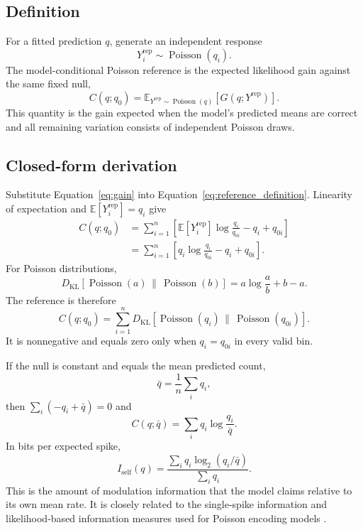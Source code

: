 \documentclass[11pt]{article}
\newcommand{\E}{\mathbb{E}}
\newcommand{\Pois}{\operatorname{Poisson}}
\newcommand{\KL}{D_{\mathrm{KL}}}
\begin{document}
\subsection{Definition}

For a fitted prediction $q$, generate an independent response
\begin{equation}
Y_i^{\mathrm{rep}}\sim\Pois(q_i).
\end{equation}
The model-conditional Poisson reference is the expected likelihood gain against the same fixed null,
\begin{equation}
C(q;q_0)
=
\E_{Y^{\mathrm{rep}}\sim\Pois(q)}
\left[G(q;Y^{\mathrm{rep}})\right].
\label{eq:reference_definition}
\end{equation}
This quantity is the gain expected when the model's predicted means are correct and all remaining variation consists of independent Poisson draws.

\subsection{Closed-form derivation}

Substitute Equation~\ref{eq:gain} into Equation~\ref{eq:reference_definition}. Linearity of expectation and $\E[Y_i^{\mathrm{rep}}]=q_i$ give
\begin{align}
C(q;q_0)
&=
\sum_{i=1}^n
\left[
 \E[Y_i^{\mathrm{rep}}]\log\frac{q_i}{q_{0i}}
 -q_i+q_{0i}
\right]\\
&=
\boxed{
\sum_{i=1}^n
\left[
 q_i\log\frac{q_i}{q_{0i}}-q_i+q_{0i}
\right]
}.
\label{eq:closed_reference}
\end{align}
For Poisson distributions,
\begin{equation}
\KL\!\left[\Pois(a)\,\|\,\Pois(b)\right]
=
a\log\frac{a}{b}+b-a.
\end{equation}
The reference is therefore
\begin{equation}
\boxed{
C(q;q_0)
=
\sum_{i=1}^n
\KL\!\left[\Pois(q_i)\,\|\,\Pois(q_{0i})\right].
}
\label{eq:kl_reference}
\end{equation}
It is nonnegative and equals zero only when $q_i=q_{0i}$ in every valid bin.

If the null is constant and equals the mean predicted count,
\begin{equation}
\bar q=\frac{1}{n}\sum_i q_i,
\end{equation}
then $\sum_i(-q_i+\bar q)=0$ and
\begin{equation}
C(q;\bar q)
=
\sum_i q_i\log\frac{q_i}{\bar q}.
\label{eq:mean_null_reference}
\end{equation}
In bits per expected spike,
\begin{equation}
I_{\mathrm{self}}(q)
=
\frac{
 \sum_i q_i\log_2(q_i/\bar q)
}{
 \sum_i q_i
}.
\label{eq:self_bits}
\end{equation}
This is the amount of modulation information that the model claims relative to its own mean rate. It is closely related to the single-spike information and likelihood-based information measures used for Poisson encoding models \cite{williamson2015}.
\end{document}
